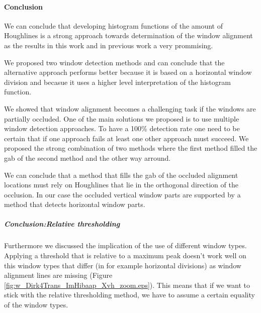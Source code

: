 
\paragraph{Conclusion}
We can conclude that developing histogram functions of the amount of Houghlines
is a strong approach towards determination of the window alignment as the
results in this work and in previous work a very prommising.

We proposed two window detection methods and can conclude that the alternative
approach performs better because it is based on a horizontal window division and
becasue it uses a higher level interpretation of the histogram function.

We showed that window alignment becomes a challenging task if the windows are partially
occluded.  One of the main solutions we proposed is to use multiple window
detection approaches.  To have a 100\% detection rate one need to be certain
that if one approach fails at least one other approach must succeed.  We
proposed the strong combination of two methods where the first method filled the
gab of the second method and the other way arround.

We can conclude that a method that fills the gab of the occluded alignment locations
must rely on Houghlines that lie in the orthogonal direction of the occlusion.
In our case the occluded vertical window parts are supported by a method that
detects horizontal window parts.

\subparagraph{Conclusion:Relative thresholding}
Furthermore we discussed the implication of the use of different window types.
Applying a threshold that is relative to a maximum peak doesn't work well on
this window types that differ (in for example horizontal divisions) as window
alignment lines are missing (Figure
\ref{fig:w_Dirk4Trans_ImHibaap_Xvh_zoom.eps}).  This means that if we want to
stick with the relative thresholding method, we have to assume a certain
equality of the window types. 




